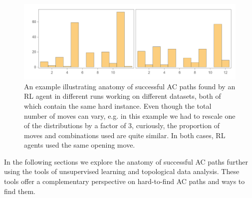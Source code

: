 \begin{figure}[h]
	\centering
	\includegraphics[scale=0.5]{fig/anatomy200.png}
	\caption{An example illustrating anatomy of successful AC paths found by an RL agent in different runs working on different datasets, both of which contain the same hard instance. Even though the total number of moves can vary, e.g. in this example we had to rescale one of the distributions by a factor of 3, curiously, the proportion of moves and combinations used are quite similar. In both cases, RL agents used the same opening move.}
	\label{fig:anatomy200}
\end{figure}

In the following sections we explore the anatomy of successful AC paths further using the tools of unsupervised learning and topological data analysis. These tools offer a complementary perspective on hard-to-find AC paths and ways to find them.
